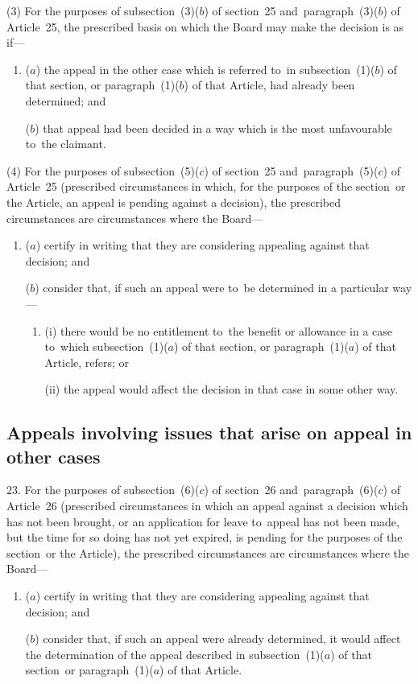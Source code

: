\documentclass[12pt,a4paper]{article}
\begin{document}
(3) For the purposes of subsection~(3)($b$)  of section~25 and~paragraph~(3)($b$)  of Article~25, the prescribed basis on which the Board may make the decision is as if—
\begin{enumerate}\item[]
($a$) the appeal in the other case which is referred to~in subsection~(1)($b$)  of that section, or paragraph~(1)($b$)  of that Article, had already been determined; and

($b$) that appeal had been decided in a way which is the most unfavourable to~the claimant.
\end{enumerate}

(4) For the purposes of subsection~(5)($c$)  of section~25 and~paragraph~(5)($c$)  of Article~25 (prescribed circumstances in which, for the purposes of the section~or the Article, an appeal is pending against a decision), the prescribed circumstances are circumstances where the Board—
\begin{enumerate}\item[]
($a$) certify in writing that they are considering appealing against that decision; and

($b$) consider that, if such an appeal were to~be determined in a particular way—
\begin{enumerate}\item[]
(i) there would be no entitlement to~the benefit or allowance in a case to~which subsection~(1)($a$)  of that section, or paragraph~(1)($a$)  of that Article, refers; or

(ii) the appeal would affect the decision in that case in some other way.
\end{enumerate}
\end{enumerate}

\subsection[23. Appeals involving issues that arise on appeal in other cases]{Appeals involving issues that arise on appeal in other cases}

23.  For the purposes of subsection~(6)($c$)  of section~26 and~paragraph~(6)($c$)  of Article~26 (prescribed circumstances in which an appeal against a decision which has not been brought, or an application for leave to~appeal has not been made, but the time for so doing has not yet expired, is pending for the purposes of the section~or the Article), the prescribed circumstances are circumstances where the Board—
\begin{enumerate}\item[]
($a$) certify in writing that they are considering appealing against that decision; and

($b$) consider that, if such an appeal were already determined, it would affect the determination of the appeal described in subsection~(1)($a$)  of that section~or paragraph~(1)($a$)  of that Article.
\end{enumerate}
\end{document}
